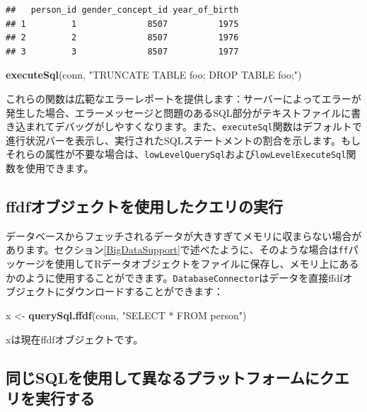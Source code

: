 \documentclass[
  11pt]{book}
\newenvironment{Shaded}{\begin{snugshade}}{\end{snugshade}}
\newcommand{\FunctionTok}[1]{\textcolor[rgb]{0.13,0.29,0.53}{\textbf{#1}}}
\newcommand{\NormalTok}[1]{#1}
\newcommand{\OtherTok}[1]{\textcolor[rgb]{0.56,0.35,0.01}{#1}}
\newcommand{\StringTok}[1]{\textcolor[rgb]{0.31,0.60,0.02}{#1}}
\theoremstyle{definition}
\theoremstyle{definition}
\theoremstyle{definition}
\theoremstyle{definition}
\theoremstyle{remark}
\begin{document}
\begin{verbatim}
##   person_id gender_concept_id year_of_birth
## 1         1              8507          1975
## 2         2              8507          1976
## 3         3              8507          1977
\end{verbatim}

\begin{Shaded}
\begin{Highlighting}[]
\FunctionTok{executeSql}\NormalTok{(conn, }\StringTok{"TRUNCATE TABLE foo; DROP TABLE foo;"}\NormalTok{)}
\end{Highlighting}
\end{Shaded}

これらの関数は広範なエラーレポートを提供します：サーバーによってエラーが発生した場合、エラーメッセージと問題のあるSQL部分がテキストファイルに書き込まれてデバッグがしやすくなります。また、\texttt{executeSql}関数はデフォルトで進行状況バーを表示し、実行されたSQLステートメントの割合を示します。もしそれらの属性が不要な場合は、\texttt{lowLevelQuerySql}および\texttt{lowLevelExecuteSql}関数を使用できます。

\subsection{ffdfオブジェクトを使用したクエリの実行}\label{ffdfux30aaux30d6ux30b8ux30a7ux30afux30c8ux3092ux4f7fux7528ux3057ux305fux30afux30a8ux30eaux306eux5b9fux884c}

データベースからフェッチされるデータが大きすぎてメモリに収まらない場合があります。セクション\ref{BigDataSupport}で述べたように、そのような場合は\texttt{ff}パッケージを使用してRデータオブジェクトをファイルに保存し、メモリ上にあるかのように使用することができます。\texttt{DatabaseConnector}はデータを直接ffdfオブジェクトにダウンロードすることができます：

\begin{Shaded}
\begin{Highlighting}[]
\NormalTok{x }\OtherTok{\textless{}{-}} \FunctionTok{querySql.ffdf}\NormalTok{(conn, }\StringTok{"SELECT * FROM person"}\NormalTok{)}
\end{Highlighting}
\end{Shaded}

xは現在ffdfオブジェクトです。

\subsection{同じSQLを使用して異なるプラットフォームにクエリを実行する}\label{ux540cux3058sqlux3092ux4f7fux7528ux3057ux3066ux7570ux306aux308bux30d7ux30e9ux30c3ux30c8ux30d5ux30a9ux30fcux30e0ux306bux30afux30a8ux30eaux3092ux5b9fux884cux3059ux308b}
\end{document}

